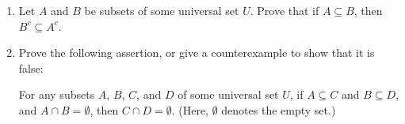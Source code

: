 \documentclass[12pt]{article}
\newcommand{\points}[1]{\marginpar{\hspace{24pt}[#1]}}
\begin{document}
\thispagestyle{fancy}

\bigskip

 \begin{enumerate}
 \item  Let $A$ and $B$ be subsets of some universal set $U$. \points{5} Prove that if $A\subseteq B$, then $B^c\subseteq A^c$.

\newpage

\item  Prove the following assertion, or give a counterexample to show that it is false:\points{5}

For any subsets $A$, $B$, $C$, and $D$ of some universal set $U$, if $A\subseteq C$ and $B\subseteq D$, and $A\cap B=\emptyset$, then $C\cap D=\emptyset$.
(Here, $\emptyset$ denotes the empty set.)

\end{enumerate}
\end{document}
